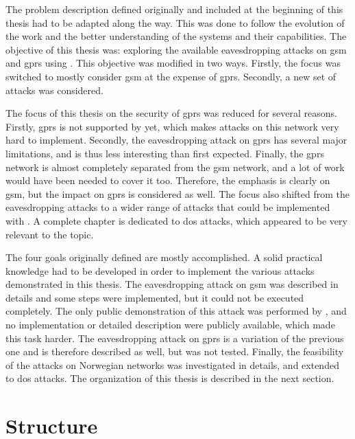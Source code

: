   The problem description defined originally and included at the
  beginning of this thesis had to be adapted along the way. This was
  done to follow the evolution of the work and the better understanding
  of the systems and their capabilities. The objective of this thesis
  was: exploring the available eavesdropping attacks on \gls{gsm} and
  \gls{gprs} using . This objective was modified in two
  ways. Firstly, the focus was switched to mostly consider \gls{gsm} at
  the expense of \gls{gprs}. Secondly, a new set of attacks was
  considered.

  The focus of this thesis on the security of \gls{gprs} was reduced for
  several reasons. Firstly, \gls{gprs} is not supported by
   yet, which makes attacks on this network very hard to
  implement. Secondly, the eavesdropping attack on \gls{gprs} has
  several major limitations, and is thus less interesting than first
  expected. Finally, the \gls{gprs} network is almost completely
  separated from the \gls{gsm} network, and a lot of work would have
  been needed to cover it too. Therefore, the emphasis is clearly on
  \gls{gsm}, but the impact on \gls{gprs} is considered as well. The
  focus also shifted from the eavesdropping attacks to a wider range of
  attacks that could be implemented with . A complete
  chapter is dedicated to \gls{dos} attacks, which appeared to be very
  relevant to the topic.

  The four goals originally defined are mostly accomplished. A solid
  practical knowledge had to be developed in order to implement the
  various attacks demonstrated in this thesis. The eavesdropping attack
  on \gls{gsm} was described in details and some steps were implemented,
  but it could not be executed completely. The only public demonstration
  of this attack was performed by , and no
  implementation or detailed description were publicly available, which
  made this task harder. The eavesdropping attack on \gls{gprs} is a
  variation of the previous one and is therefore described as well, but
  was not tested. Finally, the feasibility of the attacks on Norwegian
  networks was investigated in details, and extended to \gls{dos}
  attacks. The organization of this thesis is described in the next
  section.

  \section{Structure}

